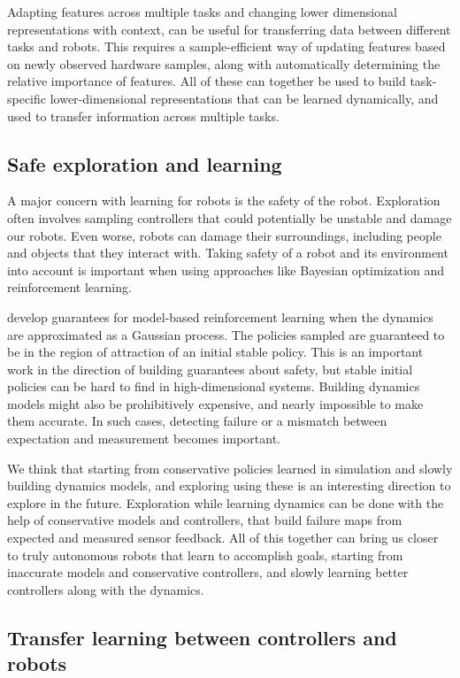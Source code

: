 Adapting features across multiple tasks and changing lower dimensional representations with context, can be useful for transferring data between different tasks and robots. This requires a sample-efficient way of updating features based on newly observed hardware samples, along with automatically determining the relative importance of features. All of these can together be used to build task-specific lower-dimensional representations that can be learned dynamically, and used to transfer information across multiple tasks.


\subsection{Safe exploration and learning}

A major concern with learning for robots is the safety of the robot. Exploration often involves sampling controllers that could potentially be unstable and damage our robots. Even worse, robots can damage their surroundings, including people and objects that they interact with. Taking safety of a robot and its environment into account is important when using approaches like Bayesian optimization and reinforcement learning.

\cite{berkenkamp2017safe} develop guarantees for model-based reinforcement learning when the dynamics are approximated as a Gaussian process. The policies sampled are guaranteed to be in the region of attraction of an initial stable policy. This is an important work in the direction of building guarantees about safety, but stable initial policies can be hard to find in high-dimensional systems. Building dynamics models might also be prohibitively expensive, and nearly impossible to make them accurate. In such cases, detecting failure or a mismatch between expectation and measurement becomes important. 

We think that starting from conservative policies learned in simulation and slowly building dynamics models, and exploring using these is an interesting direction to explore in the future. Exploration while learning dynamics can be done with the help of conservative models and controllers, that build failure maps from expected and measured sensor feedback. All of this together can bring us closer to truly autonomous robots that learn to accomplish goals, starting from inaccurate models and conservative controllers, and slowly learning better controllers along with the dynamics.

\subsection{Transfer learning between controllers and robots}

